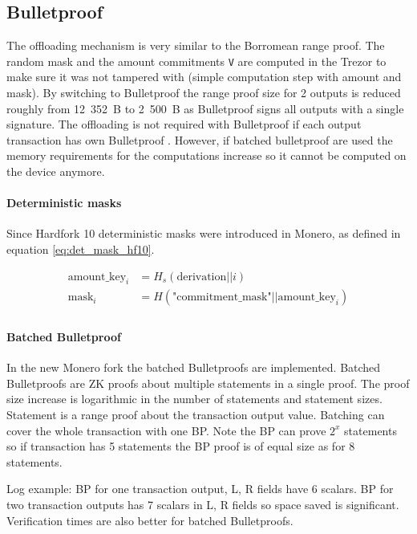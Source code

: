 \documentclass[]{article}
\begin{document}
\subsection{Bulletproof}\label{sec:bp} The offloading mechanism is very similar to the Borromean range proof. The random mask and the amount commitments \verb|V| are computed in the Trezor to make sure it was not tampered with (simple computation step with amount and mask). 
By switching to Bulletproof the range proof size for 2 outputs is reduced roughly from 12~352~B to 2~500~B as Bulletproof signs all outputs with a single signature. The offloading is not required with Bulletproof if each output transaction has own Bulletproof \cite{Bnz2017BulletproofsSP}. However, if batched bulletproof are used the memory requirements for the computations increase so it cannot be computed on the device anymore. 

\paragraph{Deterministic masks}
Since Hardfork 10 deterministic masks were introduced in Monero, as defined in equation \ref{eq:det_mask_hf10}. 

\begin{equation}
\begin{split} \label{eq:det_mask_hf10}
  \text{amount\_key}_i &= H_s(\text{derivation} || i)\\
  \text{mask}_i &= H(\text{"commitment\_mask"} || \text{amount\_key}_i)\\
\end{split}
\end{equation}

\paragraph{Batched Bulletproof} 
In the new Monero fork the batched Bulletproofs are implemented. Batched Bulletproofs are ZK proofs about multiple statements in a single proof. The proof size increase is logarithmic in the number of statements and statement sizes. Statement is a range proof about the transaction output value. Batching can cover the whole transaction with one BP. Note the BP can prove $2^x$ statements so if transaction has 5 statements the BP proof is of equal size as for 8 statements.

Log example: BP for one transaction output, L, R fields have 6 scalars. BP for two transaction outputs has 7 scalars in L, R fields so space saved is significant. Verification times are also better for batched Bulletproofs.
\end{document}
